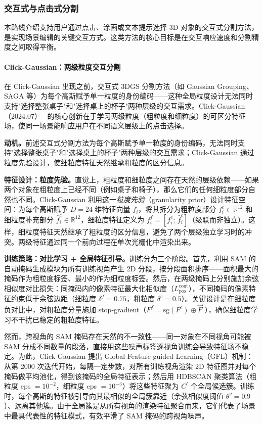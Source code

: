 \subsubsection{交互式与点击式分割}

本路线介绍支持用户通过点击、涂画或文本提示选择 3D 对象的交互式分割方法，是实现场景编辑的关键交互方式。这类方法的核心目标是在交互响应速度和分割精度之间取得平衡。

\paragraph{Click-Gaussian：两级粒度交互分割}

在 Click-Gaussian 出现之前，交互式 3DGS 分割方法（如 Gaussian Grouping、SAGA 等）为每个高斯赋予单一粒度的身份编码——这种全局粒度设计无法同时支持"选择整张桌子"和"选择桌上的杯子"两种层级的交互需求。Click-Gaussian（2024.07）~\cite{2407_11793} 的核心创新在于学习两级粒度（粗粒度和细粒度）的可区分特征场，使同一场景能响应用户在不同语义层级上的点击选择。

\textbf{动机。}前述交互式分割方法为每个高斯赋予单一粒度的身份编码，无法同时支持"选择整张桌子"和"选择桌上的杯子"两种层级的交互需求；Click-Gaussian 通过粒度先验设计，使细粒度特征天然继承粗粒度的区分信息。

\textbf{特征设计：粒度先验。}直觉上，粗粒度和细粒度之间存在天然的层级依赖——如果两个对象在粗粒度上已经不同（例如桌子和椅子），那么它们的任何细粒度部分自然也不同。Click-Gaussian 利用这一\emph{粒度先验}（granularity prior）设计特征空间：为每个高斯赋予 $D{=}24$ 维特征向量 $f_i$，将其拆分为粗粒度部分 $f_i^c \in \mathbb{R}^{12}$ 和细粒度补充部分 $\hat{f}_i^c \in \mathbb{R}^{12}$，细粒度特征定义为 $f_i^f = [f_i^c;\, \hat{f}_i^c]$（级联而非独立）。这样，细粒度特征天然继承了粗粒度的区分信息，避免了两个层级独立学习时的冲突。两级特征通过同一个前向过程在单次光栅化中渲染出来。

\textbf{训练策略：对比学习 + 全局特征引导。}训练分为三个阶段。首先，利用 SAM 的自动掩码生成模块为所有训练视角产生 2D 分段，按分段面积排序——面积最大的掩码作为粗粒度标签、最小的作为细粒度标签。然后，在两级掩码上分别施加余弦相似度对比损失：同掩码内的像素特征最大化相似度（$L_{\text{pos}}^{\text{cont}}$），不同掩码的像素特征约束低于余弦边距（细粒度 $\delta^f{=}0.75$，粗粒度 $\delta^c{=}0.5$）。关键设计是在细粒度负对比中，对粗粒度分量施加 stop-gradient（$F^f = \text{sg}(F^c) \oplus \hat{F}^c$），确保细粒度学习不干扰已稳定的粗粒度特征。

然而，跨视角的 SAM 掩码存在天然的不一致性——同一对象在不同视角可能被 SAM 分成不同数量的段落，直接用这些噪声标签逐视角训练会导致特征场不稳定。为此，Click-Gaussian 提出 Global Feature-guided Learning（GFL）机制：从第 2000 次迭代开始，每隔一定步数，对所有训练视角渲染 2D 特征图并对每个掩码做平均池化，得到该掩码的全局特征表示；然后用 HDBSCAN 聚类算法（粗粒度 eps $= 10^{-2}$，细粒度 eps $= 10^{-3}$）将这些特征聚为 $C^l$ 个全局候选簇。训练时，每个高斯的特征被引导向其最相似的全局簇靠近（余弦相似度阈值 $\theta^g{=}0.9$）、远离其他簇。由于全局簇是从所有视角的渲染特征聚合而来，它们代表了场景中最具代表性的特征模式，有效平滑了 SAM 掩码的跨视角噪声。

